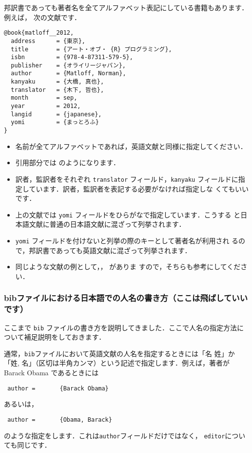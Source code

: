 \documentclass[article]{jlreq}
\begin{document}
邦訳書であっても著者名を全てアルファベット表記にしている書籍もあります．例えば，
次の文献です．
\begin{screen}
\begin{verbatim}
@book{matloff__2012,
  address      = {東京},
  title        = {アート・オブ・ {R} プログラミング},
  isbn         = {978-4-87311-579-5},
  publisher    = {オライリージャパン},
  author       = {Matloff, Norman},
  kanyaku      = {大橋, 真也},
  translator   = {木下, 哲也},
  month        = sep,
  year         = 2012,
  langid       = {japanese},
  yomi         = {まっとろふ}
}
\end{verbatim}
\end{screen}
\begin{itemize}
 \item 名前が全てアルファベットであれば，英語文献と同様に指定してください．
 \item 引用部分では \citet{matloff__2012} のようになります．
 \item 訳者，監訳者をそれぞれ \texttt{translator} フィールド，\texttt{kanyaku}
       フィールドに指定しています．訳者，監訳者を表記する必要がなければ指定しな
       くてもいいです．
 \item 上の文献では \texttt{yomi} フィールドをひらがなで指定しています．こうする
       と日本語文献に普通の日本語文献に混ざって列挙されます．
 \item \texttt{yomi} フィールドを付けないと列挙の際のキーとして著者名が利用され
       るので，邦訳書であっても英語文献に混ざって列挙されます．
 \item 同じような文献の例として，\citet{Ryza2016}，\citet{Boswell-2012} がありま
       すので，そちらも参考にしてください．
\end{itemize}

\subsubsection{bibファイルにおける日本語での人名の書き方（ここは飛ばしていいです）}
\label{sec:nihonjin}

ここまで \texttt{bib} ファイルの書き方を説明してきました．ここで人名の指定方法に
ついて補足説明をしておきます．

通常，\texttt{bib}ファイルにおいて英語文献の人名を指定するときには「名 姓」か
「姓, 名」（区切は半角カンマ）という記述で指定します．例えば，著者が Barack
Obama であるときには
\begin{screen}
\begin{verbatim}
 author =       {Barack Obama}
\end{verbatim}
\end{screen}
あるいは，
\begin{screen}
\begin{verbatim}
 author =       {Obama, Barack}
\end{verbatim}
\end{screen}
のような指定をします．これは\texttt{author}フィールドだけではなく，
\texttt{editor}についても同じです．
\end{document}
